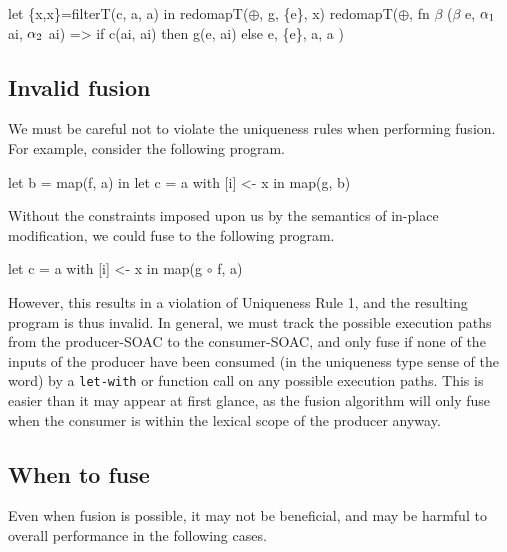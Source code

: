 \begin{colorcode}
let \{x,x\}=filterT(c, a, a)
in  redomapT(\(\oplus\), g, \{e\}, x)
    \emphh{\(\Downarrow\)}
redomapT(\(\oplus\),
         fn \(\beta\) (\(\beta\) e, \(\alpha_{1}\) ai, \(\alpha_{2}\) ai) =>
           if c(ai, ai)
           then g(e, ai)
           else e,
         \{e\}, a, a )
\end{colorcode}

\subsection{Invalid fusion}
\label{sec:invalidfusion}

We must be careful not to violate the uniqueness rules when performing
fusion.  For example, consider the following program.

\begin{colorcode}
let b = map(f, a) in
let c = a with [i] <- x in
map(g, b)
\end{colorcode}

Without the constraints imposed upon us by the semantics of in-place
modification, we could fuse to the following program.

\begin{colorcode}
let c = a with [i] <- x in
map(g \(\circ\) f, a)
\end{colorcode}

However, this results in a violation of Uniqueness Rule 1, and the
resulting program is thus invalid.  In general, we must track the
possible execution paths from the producer-SOAC to the consumer-SOAC,
and only fuse if none of the inputs of the producer have been consumed
(in the uniqueness type sense of the word) by a \texttt{let-with} or
function call on any possible execution paths.  This is easier than it
may appear at first glance, as the fusion algorithm will only fuse
when the consumer is within the lexical scope of the producer anyway.

\subsection{When to fuse}
\label{sec:whentofuse}

Even when fusion is possible, it may not be beneficial, and may be
harmful to overall performance in the following cases.

